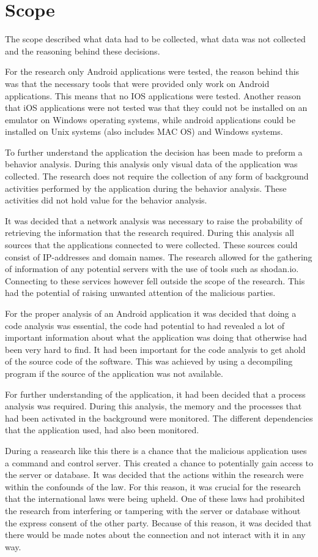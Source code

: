 \section{Scope}

The scope described what data had to be collected, what data was not collected and the reasoning behind these decisions.

For the research only Android applications were tested, the reason behind this was that the necessary tools that were provided only work on Android applications. This means that no IOS applications were tested. Another reason that iOS applications were not tested was that they could not be installed on an emulator on Windows operating systems, while android applications could be installed on Unix systems (also includes MAC OS) and Windows systems.

To further understand the application the decision has been made to preform a behavior analysis. During this analysis only visual data of the application was collected. The research does not require the collection of any form of background activities performed by the application during the behavior analysis. These activities did not hold value for the behavior analysis.

It was decided that a network analysis was necessary to raise the probability of retrieving the information that the research required. During this analysis all sources that the applications connected to were collected. These sources could consist of IP-addresses and domain names. The research allowed for the gathering of information of any potential servers with the use of tools such as shodan.io. Connecting to these services however fell outside the scope of the research. This had the potential of raising unwanted attention of the malicious parties.

For the proper analysis of an Android application it was decided that doing a code analysis was essential, the code had potential to had revealed a lot of important information about what the application was doing that otherwise had been very hard to find. It had been important for the code analysis to get ahold of the source code of the software. This was achieved by using a decompiling program if the source of the application was not available.

For further understanding of the application, it had been decided that a process analysis was required. During this analysis, the memory and the processes that had been activated in the background were monitored. The different dependencies that the application used, had also been monitored.

During a reasearch like this there is a chance that the malicious application uses a command and control server. This created a chance to potentially gain access to the server or database. It was decided that the actions within the research were within the confounds of the law. For this reason, it was crucial for the research that the international laws were being upheld. One of these laws had prohibited the research from interfering or tampering with the server or database without the express consent of the other party. Because of this reason, it was decided that there would be made notes about the connection and not interact with it in any way.